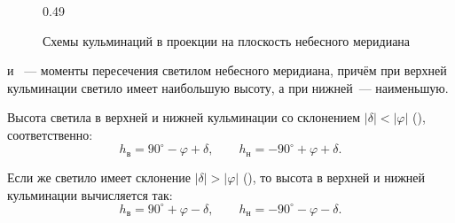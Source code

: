 \begin{figure}[h!]
\begin{subcaptionblock}{0.49\tw}
        \caption{$|\delta| > |\varphi|$}
        \label{pic:culmination-greater}
    \end{subcaptionblock}
    \caption{Схемы кульминаций в проекции на плоскость небесного меридиана}
    \label{}
\end{figure}

 и ~--- моменты пересечения светилом небесного меридиана, причём при верхней кульминации светило имеет наибольшую высоту, а при нижней~--- наименьшую.

Высота светила в верхней и нижней кульминации со склонением $|\delta| < |\varphi|$ (), соответственно:
\begin{equation}
    h_{\text{в}}= 90^\circ - \varphi + \delta, \quad\quad
    h_{\text{н}}= - 90^\circ + \varphi  + \delta.
\end{equation}

Если же светило имеет склонение $|\delta| > |\varphi|$ (), то высота в верхней и нижней кульминации вычисляется так:
\begin{equation}
    h_{\text{в}}= 90^\circ + \varphi - \delta, \quad\quad
    h_{\text{н}}= - 90^\circ -\varphi - \delta.
\end{equation}


